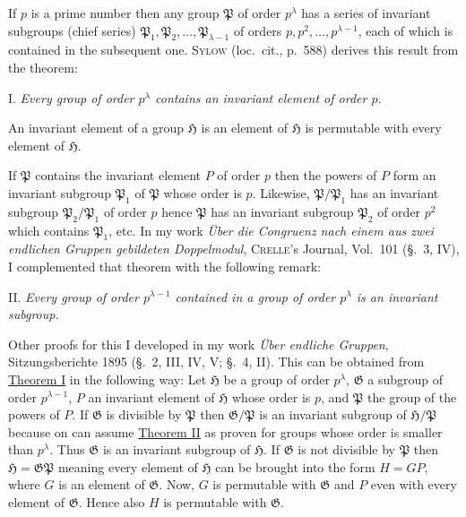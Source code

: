 \documentclass[a5paper,12pt]{article}
\let\fr\mathfrak
\newcommand{\CG}{\fr{G}}
\newcommand{\CH}{\fr{H}}
\newcommand{\CP}{\fr{P}}
\newcommand{\?}{{\color{blue}${}^{(?)}$}}
\newcounter{origpagecounter}{}
\newcommand{\origpagebreak}{\mark{\arabic{origpagecounter}}\addtocounter{origpagecounter}{1}\mark{\arabic{origpagecounter}}}
\begin{document}
If $p$ is a prime number
then any group $\CP$ of order $p^\lambda$
has
a series of invariant subgroups (chief series)
$\CP_1, \CP_2, \ldots, \CP_{\lambda-1}$
of orders
$p, p^2, \ldots, p^{\lambda-1}$,
each of which is contained in the subsequent one.
%
%
\textsc{Sylow} (loc.~cit., p.~588) derives this result 
from the theorem:


I.
%
\label{t:1-1}
%
\emph{ %
Every group of order $p^\lambda$ contains
an invariant element of order $p$.
}


An invariant element of a group $\CH$
is an element of $\CH$
is permutable with every element of $\CH$.
%
\origpagebreak
%
If $\CP$ contains 
the invariant element $P$ of order $p$
then
the powers
of $P$ form
an invariant subgroup $\CP_1$ of $\CP$
whose order is $p$.
%
%
Likewise,
$\CP / \CP_1$ has 
an invariant subgroup $\CP_2 / \CP_1$ of order $p$
hence
$\CP$ has an invariant subgroup $\CP_2$ of order $p^2$
which contains $\CP_1$, etc.
%
%
In my work
\emph{\"Uber die Congruenz nach einem aus zwei endlichen Gruppen gebildeten Doppelmodul},
\textsc{Crelle}'s Journal, Vol.~101
(\S.~3, IV), 
I complemented
that theorem with the following remark:


II.
%
\label{t:1-2}
%
\emph{ %
Every group of order $p^{\lambda-1}$ 
contained in a group of order $p^\lambda$
is an invariant subgroup.
}


Other proofs for this
I developed 
in my work
\emph{\"Uber endliche Gruppen},
Sit\-zungs\-be\-richte 1895
(\S.~2, III, IV, V; \S.~4, II).
%
%
This can be obtained from 
\hyperref[t:1-1]{Theorem I}
in the following way:
%
%
Let
$\CH$ be a group of order $p^\lambda$,
$\CG$ a subgroup of order $p^{\lambda-1}$,
$P$ an invariant element of $\CH$
whose order is $p$,
and
$\CP$ the group of the powers of 
$P$. %
%
%
If $\CG$ is divisible by $\CP$
then
$\CG / \CP$ 
is an invariant subgroup of $\CH / \CP$
because
on can assume 
\hyperref[t:1-2]{Theorem II}
as proven
for groups whose order is smaller than $p^\lambda$.
%
%
Thus $\CG$ is an invariant subgroup of $\CH$.
%
%
If $\CG$ is not divisible by $\CP$
then $\CH = \CG \CP$
meaning
every element of $\CH$
can be brought into the form $H = G P$,
where $G$ is an element of $\CG$.
%
%
Now,
$G$ is permutable with $\CG$
and
$P$ even with every element of $\CG$.
%
%
Hence
also $H$ is permutable with $\CG$.
\end{document}
